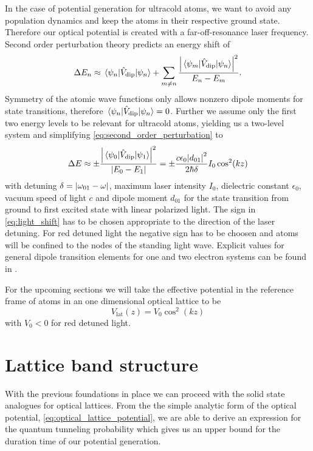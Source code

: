 In the case of potential generation for ultracold atoms, we want to avoid any
population dynamics and keep the atoms in their respective ground state.
Therefore our optical potential is created with a far-off-resonance laser
frequency. Second order perturbation theory predicts an energy shift of
\begin{equation}
  \Delta E_n
  \approx
  \mel{\psi_n}{\hat{V}_\text{dip}}{\psi_n}
  +
  \sum_{m\neq n}\frac{\abs{\mel{\psi_m}{\hat{V}_\text{dip}}{\psi_n}}^2}{E_n-E_m}
  \label{eq:second_order_perturbation}.
\end{equation}
Symmetry of the atomic wave functions only allows nonzero dipole moments for
state transitions, therefore $\mel{\psi_n}{\hat{V}_\text{dip}}{\psi_n}=0$.
Further we assume only the first two energy levels to be relevant for
ultracold atoms, yielding us a two-level system and simplifying
\cref{eq:second_order_perturbation} to
\begin{equation}
  \Delta E
  \approx
  \pm\frac{\abs{\mel{\psi_0}{\hat{V}_\text{dip}}{\psi_1}}^2}{\abs{E_0-E_1}}
  =
  \pm\frac{c\epsilon_0 \abs{d_{01}}^2}{2\hbar\delta}I_0\cos^2(kz)
  \label{eq:light_shift}
\end{equation}
with detuning $\delta=\abs{\omega_{01}-\omega}$, maximum laser intensity
$I_0$, dielectric constant $\epsilon_0$, vacuum speed of light $c$ and dipole
moment $d_{01}$ for the state transition from ground to first excited state
with linear polarized light. The sign in \cref{eq:light_shift} has to be
chosen appropriate to the direction of the laser detuning. For red detuned
light the negative sign has to be choosen and atoms will be confined to the
nodes of the standing light wave. Explicit values for general dipole
transition elements for one and two electron systems can be found in
\cite{Bethe1957}.

For the upcoming sections we will take the effective potential in the reference
frame of atoms in an one dimensional optical lattice to be
\begin{equation}
  V_\text{lat}(z)=V_0\cos^2(kz)
  \label{eq:potential_lattice}
\end{equation}
with $V_0<0$ for red detuned light.

\section{Lattice band structure}

With the previous foundations in place we can proceed with the solid state
analogues for optical lattices. From the  the simple analytic form of the
optical potential, \cref{eq:optical_lattice_potential}, we are able to
derive an expression for the quantum tunneling probability which gives us
an upper bound for the duration time of our potential generation.

